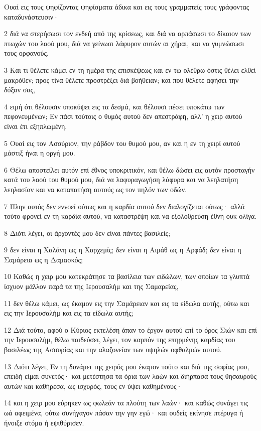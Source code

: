 \par Ουαί εις τους ψηφίζοντας ψηφίσματα άδικα και εις τους γραμματείς τους γράφοντας καταδυνάστευσιν·
\par 2 διά να στερήσωσι τον ενδεή από της κρίσεως, και διά να αρπάσωσι το δίκαιον των πτωχών του λαού μου, διά να γείνωσι λάφυρον αυτών αι χήραι, και να γυμνώσωσι τους ορφανούς.
\par 3 Και τι θέλετε κάμει εν τη ημέρα της επισκέψεως και εν τω ολέθρω όστις θέλει ελθεί μακρόθεν; προς τίνα θέλετε προστρέξει διά βοήθειαν; και που θέλετε αφήσει την δόξαν σας,
\par 4 ειμή ότι θέλουσιν υποκύψει εις τα δεσμά, και θέλουσι πέσει υποκάτω των πεφονευμένων; Εν πάσι τούτοις ο θυμός αυτού δεν απεστράφη, αλλ' η χειρ αυτού είναι έτι εξηπλωμένη.
\par 5 Ουαί εις τον Ασσύριον, την ράβδον του θυμού μου, αν και η εν τη χειρί αυτού μάστιξ ήναι η οργή μου.
\par 6 Θέλω αποστείλει αυτόν επί έθνος υποκριτικόν, και θέλω δώσει εις αυτόν προσταγήν κατά του λαού του θυμού μου, διά να λαφυραγωγήση λάφυρα και να λεηλατήση λεηλασίαν και να καταπατήση αυτούς ως τον πηλόν των οδών.
\par 7 Πλην αυτός δεν εννοεί ούτως και η καρδία αυτού δεν διαλογίζεται ούτως· αλλά τούτο φρονεί εν τη καρδία αυτού, να καταστρέψη και να εξολοθρεύση έθνη ουκ ολίγα.
\par 8 Διότι λέγει, οι άρχοντές μου δεν είναι πάντες βασιλείς;
\par 9 δεν είναι η Χαλάνη ως η Χαρχεμίς; δεν είναι η Αιμάθ ως η Αρφάδ; δεν είναι η Σαμάρεια ως η Δαμασκός;
\par 10 Καθώς η χειρ μου κατεκράτησε τα βασίλεια των ειδώλων, των οποίων τα γλυπτά ίσχυον μάλλον παρά τα της Ιερουσαλήμ και της Σαμαρείας,
\par 11 δεν θέλω κάμει, ως έκαμον εις την Σαμάρειαν και εις τα είδωλα αυτής, ούτω και εις την Ιερουσαλήμ και εις τα είδωλα αυτής;
\par 12 Διά τούτο, αφού ο Κύριος εκτελέση άπαν το έργον αυτού επί το όρος Σιών και επί την Ιερουσαλήμ, θέλω παιδεύσει, λέγει, τον καρπόν της επηρμένης καρδίας του βασιλέως της Ασσυρίας και την αλαζονείαν των υψηλών οφθαλμών αυτού.
\par 13 Διότι λέγει, Εν τη δυνάμει της χειρός μου έκαμον τούτο και διά της σοφίας μου, επειδή είμαι συνετός· και μετέστησα τα όρια των λαών και διήρπασα τους θησαυρούς αυτών και καθήρεσα, ως ισχυρός, τους εν ύψει καθημένους·
\par 14 και η χειρ μου εύρηκεν ως φωλεάν τα πλούτη των λαών· και καθώς συνάγει τις ωά αφειμένα, ούτω συνήγαγον πάσαν την γην εγώ· και ουδείς εκίνησε πτέρυγα ή ήνοιξε στόμα ή εψιθύρισεν.
